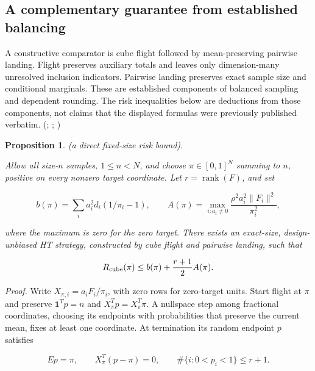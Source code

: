 \documentclass[11pt]{article}
\newtheorem{proposition}[theorem]{Proposition}
\begin{document}
\subsection{A complementary guarantee from established
balancing}\label{a-complementary-guarantee-from-established-balancing}

A constructive comparator is cube flight followed by
mean-preserving pairwise landing. Flight preserves auxiliary totals and
leaves only dimension-many unresolved inclusion indicators. Pairwise
landing preserves exact sample size and conditional marginals. These are
established components of balanced sampling and dependent rounding. The
risk inequalities below are deductions from those components, not claims
that the displayed formulas were previously published verbatim.
(\citealp{DevilleTille2004};
\citealp[equations (5)--(7)]{Chauvet2009};
\citealp[Theorem 2.3]{GandhiEtAl2006})

\begin{proposition}\label{th:3} (a direct fixed-size risk bound).

Allow all size-\(n\) samples, \(1\le n<N\), and choose \(\pi\in[0,1]^N\)
summing to \(n\), positive on every nonzero target coordinate. Let
\(r=\operatorname{rank}(F)\), and set

\begin{equation}\label{eq:18}
b(\pi)=\sum_i a_i^2d_i(1/\pi_i-1),\qquad
A(\pi)=\max_{i:a_i\ne0}
\frac{\rho^2a_i^2\|F_i\|^2}{\pi_i^2}, 
\end{equation}

where the maximum is zero for the zero target. There exists an
exact-size, design-unbiased HT strategy, constructed by cube flight and
pairwise landing, such that

\begin{equation}\label{eq:19}
R_{\rm cube}(\pi)\le b(\pi)+\frac{r+1}{2}A(\pi). 
\end{equation}

\end{proposition}

\emph{Proof.} Write \(X_{\pi,i}=a_iF_i/\pi_i\), with zero rows for
zero-target units. Start flight at \(\pi\) and preserve
\(\mathbf1^Tp=n\) and \(X_\pi^Tp=X_\pi^T\pi\). A nullspace step among
fractional coordinates, choosing its endpoints with probabilities that
preserve the current mean, fixes at least one coordinate. At termination
its random endpoint \(p\) satisfies

\begin{equation}\label{eq:20}
Ep=\pi,\qquad X_\pi^T(p-\pi)=0,
\qquad \#\{i:0<p_i<1\}\le r+1. 
\end{equation}
\end{document}
